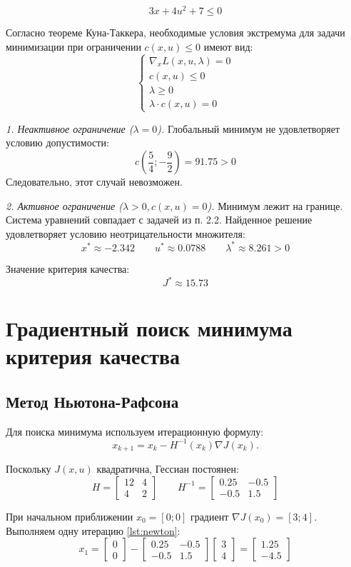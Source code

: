 \documentclass[a4paper,12pt]{article}
\begin{document}
 \[3x + 4u^2 + 7 \leq 0\]
 
 Согласно теореме Куна-Таккера, необходимые условия экстремума для задачи минимизации при ограничении \(c(x,u) \leq 0\) имеют вид:
 \[
 \begin{cases}
 	\nabla_x L(x, u, \lambda) = 0 \\
 	c(x,u) \leq 0 \\
 	\lambda \geq 0 \\
 	\lambda \cdot c(x,u) = 0
 \end{cases}
 \]

\textit{1. Неактивное ограничение (\(\lambda = 0\)).}
Глобальный минимум не удовлетворяет условию допустимости:
\[
c\left(\dfrac{5}{4}; -\dfrac{9}{2}\right) = 91.75 > 0
\]
Следовательно, этот случай невозможен.

\textit{2. Активное ограничение (\(\lambda > 0, c(x,u) = 0\)).}
Минимум лежит на границе. Система уравнений совпадает с задачей из п. 2.2. Найденное решение удовлетворяет условию неотрицательности множителя:
\[
x^* \approx -2.342 \qquad u^* \approx 0.0788 \qquad \lambda^* \approx 8.261 > 0
\]

Значение критерия качества:
\[
J^* \approx 15.73
\]
	
	
	
\newpage \section{Градиентный поиск минимума критерия качества}	

\subsection{Метод Ньютона-Рафсона}

Для поиска минимума используем итерационную формулу:
\[
x_{k+1} = x_k - H^{-1}(x_k) \nabla J(x_k).
\]

Поскольку \(J(x,u)\) квадратична, Гессиан постоянен:
\[
H = \begin{bmatrix} 12 & 4 \\ 4 & 2 \end{bmatrix} \qquad H^{-1} = \begin{bmatrix} 0.25 & -0.5 \\ -0.5 & 1.5 \end{bmatrix}
\]

При начальном приближении \(x_0 = [0; 0]\) градиент \(\nabla J(x_0) = [3; 4]\). Выполняем одну итерацию \ref{lst:newton}:
\[
x_1 = \begin{bmatrix} 0 \\ 0 \end{bmatrix} - \begin{bmatrix} 0.25 & -0.5 \\ -0.5 & 1.5 \end{bmatrix} \begin{bmatrix} 3 \\ 4 \end{bmatrix} = \begin{bmatrix} 1.25 \\ -4.5 \end{bmatrix}
\]
\end{document}
